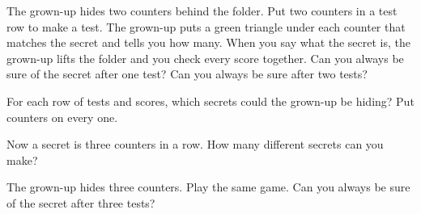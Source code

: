 \newpage

\problem The grown-up hides two counters behind the folder.
Put two counters in a test row to make a test.
The grown-up puts a green triangle under each counter that matches the secret and tells you how many.
When you say what the secret is, the grown-up lifts the folder and you check every score together.
Can you always be sure of the secret after one test?
Can you always be sure after two tests?

\vspace{0.2in}

\newpage

\problem For each row of tests and scores, which secrets could the grown-up be hiding?
Put counters on every one.

\vspace{0.15in}
\pzsep
{}
\pzsep
{}
\pzsep
{}
\pzsep
{}

\newpage

\problem Now a secret is three counters in a row.
How many different secrets can you make?

\vspace{0.3in}
\noindent{}\hfill{}\par
\vspace{0.3in}
\noindent{}\hfill{}\par
\vspace{0.3in}
\noindent{}\hfill{}\par
\vspace{0.3in}
\noindent{}\hfill{}\par
\vspace{0.3in}
\noindent{}\hfill{}\par

\newpage

\problem The grown-up hides three counters. Play the same game.
Can you always be sure of the secret after three tests?

\vspace{0.2in}


